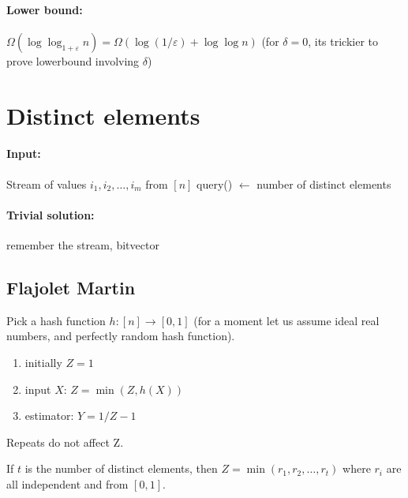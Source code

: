 \documentclass[11pt]{article}
\begin{document}
\paragraph{Lower bound:} $\Omega(\log \log_{1+\varepsilon} n) = \Omega(\log(1/\varepsilon) + \log \log n)$ (for $\delta=0$, its trickier to prove lowerbound involving $\delta$)


\section{Distinct elements}

\paragraph{Input:} Stream of values $i_1, i_2, …, i_m$ from $[n]$
query() $\leftarrow$ number of distinct elements

\paragraph{Trivial solution:} remember the stream, bitvector
\subsection{Flajolet Martin \cite{DBLP:journals/jcss/FlajoletM85}}
Pick a hash function $h: [n] \rightarrow [0,1]$     (for a moment let us assume ideal real numbers, and perfectly random hash function).

\begin{enumerate}
\item initially $Z=1$
\item input $X$: $Z = \min(Z, h(X))$
\item estimator: $Y = 1/Z - 1$
\end{enumerate}

\begin{observation}
Repeats do not affect Z.
\end{observation}

If $t$ is the number of distinct elements, then $Z = \min(r_1, r_2, \dots, r_t)$ where $r_i$ are all independent and from $[0,1]$.
\end{document}
